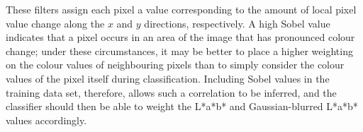 These filters assign each pixel a value corresponding to the amount of local pixel value change along the $x$ and $y$ directions, respectively.  A high Sobel value indicates that a pixel occurs in an area of the image that has pronounced colour change; under these circumstances, it may be better to place a higher weighting on the colour values of neighbouring pixels than to simply consider the colour values of the pixel itself during classification.  Including Sobel values in the training data set, therefore, allows such a correlation to be inferred, and the classifier should then be able to weight the L*a*b* and Gaussian-blurred L*a*b* values accordingly.